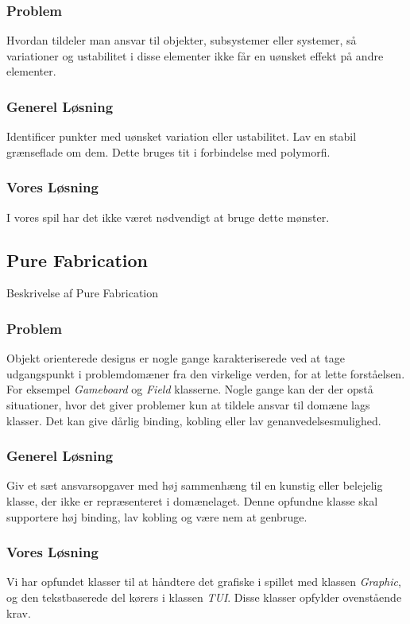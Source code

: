 \subsubsection{Problem}
Hvordan tildeler man ansvar til objekter, subsystemer eller systemer, så variationer og ustabilitet i disse elementer ikke får en uønsket effekt på andre elementer.
\subsubsection{Generel Løsning}
Identificer punkter med uønsket variation eller ustabilitet. Lav en stabil grænseflade om dem. Dette bruges tit i forbindelse med polymorfi.
\subsubsection{Vores Løsning}
I vores spil har det ikke været nødvendigt at bruge dette mønster.
\subsection{Pure Fabrication}
Beskrivelse af Pure Fabrication
\subsubsection{Problem}
Objekt orienterede designs er nogle gange karakteriserede ved at tage udgangspunkt i problemdomæner fra den virkelige verden, for at lette forståelsen. For eksempel \textit{Gameboard} og \textit{Field} klasserne. Nogle gange kan der der opstå situationer, hvor det giver problemer kun at tildele ansvar til domæne lags klasser. Det kan give dårlig binding, kobling eller lav genanvedelsesmulighed.
\subsubsection{Generel Løsning}
Giv et sæt ansvarsopgaver med høj sammenhæng til en kunstig eller belejelig klasse, der ikke er repræsenteret i domænelaget. Denne opfundne klasse skal supportere høj binding, lav kobling og være nem at genbruge.
\subsubsection{Vores Løsning}
Vi har opfundet klasser til at håndtere det grafiske i spillet med klassen \textit{Graphic}, og den tekstbaserede del kørers i klassen \textit{TUI}. Disse klasser opfylder ovenstående krav.